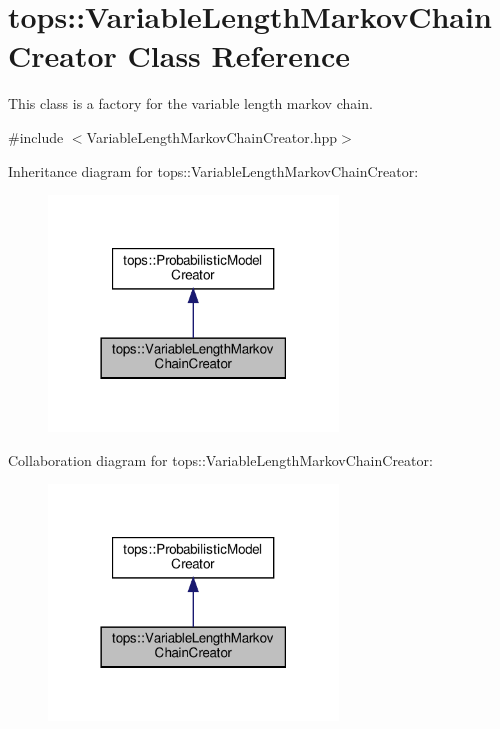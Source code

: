 \hypertarget{classtops_1_1VariableLengthMarkovChainCreator}{}\section{tops\+:\+:Variable\+Length\+Markov\+Chain\+Creator Class Reference}
\label{classtops_1_1VariableLengthMarkovChainCreator}


This class is a factory for the variable length markov chain.  




{\ttfamily \#include $<$Variable\+Length\+Markov\+Chain\+Creator.\+hpp$>$}



Inheritance diagram for tops\+:\+:Variable\+Length\+Markov\+Chain\+Creator\+:
\nopagebreak
\begin{figure}[H]
\begin{center}
\leavevmode
\includegraphics[width=218pt]{classtops_1_1VariableLengthMarkovChainCreator__inherit__graph}
\end{center}
\end{figure}


Collaboration diagram for tops\+:\+:Variable\+Length\+Markov\+Chain\+Creator\+:
\nopagebreak
\begin{figure}[H]
\begin{center}
\leavevmode
\includegraphics[width=218pt]{classtops_1_1VariableLengthMarkovChainCreator__coll__graph}
\end{center}
\end{figure}
